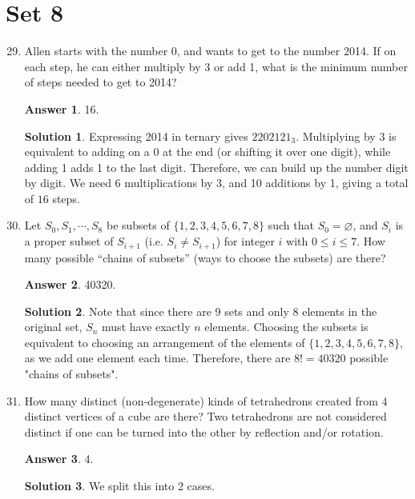 \documentclass[11pt]{article}
\theoremstyle{definition}
\newtheorem*{solution}{Solution}
\newtheorem*{answer}{Answer}
\begin{document}
\section*{Set 8}
\begin{enumerate}
\setcounter{enumi}{28}

\item Allen starts with the number 0, and wants to get to the number 2014. If on each step, he can either multiply by 3 or add 1, what is the minimum number of steps needed to get to 2014?

\begin{answer}
16.
\end{answer}
\begin{solution} Expressing 2014 in ternary gives $2202121_3$. Multiplying by 3 is equivalent to adding on a 0 at the end (or shifting it over one digit), while adding 1 adds 1 to the last digit. Therefore, we can build up the number digit by digit. We need 6 multiplications by 3, and 10 additions by 1, giving a total of $\boxed{16}$ steps.

\end{solution}

\item Let $S_0, S_1, \cdots, S_8$ be subsets of $\{1,2,3,4,5,6,7,8\}$ such that $S_0 = \varnothing$, and $S_i$ is a proper subset of $S_{i+1}$ (i.e. $S_i \neq S_{i+1}$) for integer $i$ with $0 \leq i \leq 7$. How many possible “chains of subsets” (ways to choose the subsets) are there?

\begin{answer}
40320.
\end{answer}
\begin{solution} Note that since there are 9 sets and only 8 elements in the original set, $S_n$ must have exactly $n$ elements. Choosing the subsets is equivalent to choosing an arrangement of the elements of $\{1,2,3,4,5,6,7,8\}$, as we add one element each time. Therefore, there are $8! = \boxed{40320}$ possible "chains of subsets".

\end{solution}

\item How many distinct (non-degenerate) kinds of tetrahedrons created from 4 distinct vertices of a cube are there? Two tetrahedrons are not considered distinct if one can be turned into the other by reflection and/or rotation.

\begin{answer}
4.
\end{answer}
\begin{solution} We split this into 2 cases.

\end{solution}
\end{enumerate}
\end{document}
